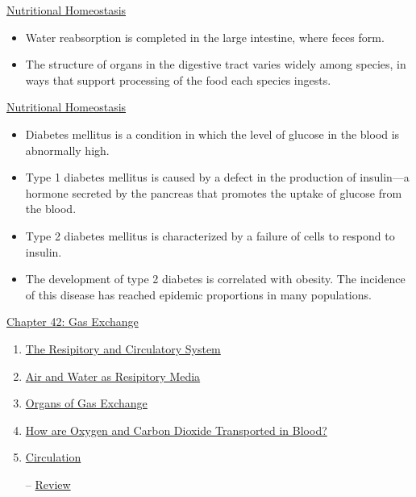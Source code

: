 \documentclass[12pt,letterpaper]{article}
\newcommand{\thetitle}{\hypertarget{home}{Animals and Ecology}}
\begin{document}
\begin{secbox}{\hyperlink{41}{Nutritional Homeostasis}}
{\begin{itemize}
        \item Water reabsorption is completed in the large intestine, where feces form. 
        \item The structure of organs in the digestive tract varies widely among species, in ways that support processing of the food each species ingests.
    \end{itemize}
    \hyperlink{41.4}{Nutritional Homeostasis}
    \begin{itemize}
        \item Diabetes mellitus is a condition in which the level of glucose in the blood is abnormally high.
        \item Type 1 diabetes mellitus is caused by a defect in the production of insulin—a hormone secreted by the pancreas that promotes the uptake of glucose from the blood.
        \item Type 2 diabetes mellitus is characterized by a failure of cells to respond to insulin.
        \item The development of type 2 diabetes is correlated with obesity. The incidence of this disease has reached epidemic proportions in many populations.
    \end{itemize}

}\end{secbox}


\clearpage

\renewcommand{\thetitle}{\hypertarget{42}{Gas Exchange}}
\hypertarget{42}{}
\setcounter{section}{42}

\begin{chapbox}{\hyperlink{home}{Chapter 42: Gas Exchange}}
    \begin{enumerate}
        \item \hyperlink{42.1}{The Resipitory and Circulatory System}
        \item \hyperlink{42.2}{Air and Water as Resipitory Media}
        \item \hyperlink{42.3}{Organs of Gas Exchange}
        \item \hyperlink{42.4}{How are Oxygen and Carbon Dioxide Transported in Blood?}
        \item \hyperlink{42.5}{Circulation}
        \item [--] \hyperlink{42.r}{Review}
    \end{enumerate}
\end{chapbox}
\end{document}
